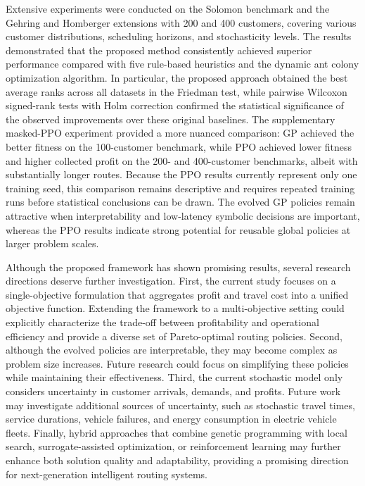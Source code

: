 \documentclass[pdflatex]{sn-jnl}
\begin{document}
Extensive experiments were conducted on the Solomon benchmark and the Gehring and Homberger extensions with 200 and 400 customers, covering various customer distributions, scheduling horizons, and stochasticity levels. The results demonstrated that the proposed method consistently achieved superior performance compared with five rule-based heuristics and the dynamic ant colony optimization algorithm. In particular, the proposed approach obtained the best average ranks across all datasets in the Friedman test, while pairwise Wilcoxon signed-rank tests with Holm correction confirmed the statistical significance of the observed improvements over these original baselines. The supplementary masked-PPO experiment provided a more nuanced comparison: GP achieved the better fitness on the 100-customer benchmark, while PPO achieved lower fitness and higher collected profit on the 200- and 400-customer benchmarks, albeit with substantially longer routes. Because the PPO results currently represent only one training seed, this comparison remains descriptive and requires repeated training runs before statistical conclusions can be drawn. The evolved GP policies remain attractive when interpretability and low-latency symbolic decisions are important, whereas the PPO results indicate strong potential for reusable global policies at larger problem scales.

Although the proposed framework has shown promising results, several research directions deserve further investigation. First, the current study focuses on a single-objective formulation that aggregates profit and travel cost into a unified objective function. Extending the framework to a multi-objective setting could explicitly characterize the trade-off between profitability and operational efficiency and provide a diverse set of Pareto-optimal routing policies. Second, although the evolved policies are interpretable, they may become complex as problem size increases. Future research could focus on simplifying these policies while maintaining their effectiveness. Third, the current stochastic model only considers uncertainty in customer arrivals, demands, and profits. Future work may investigate additional sources of uncertainty, such as stochastic travel times, service durations, vehicle failures, and energy consumption in electric vehicle fleets. Finally, hybrid approaches that combine genetic programming with local search, surrogate-assisted optimization, or reinforcement learning may further enhance both solution quality and adaptability, providing a promising direction for next-generation intelligent routing systems.
\end{document}
